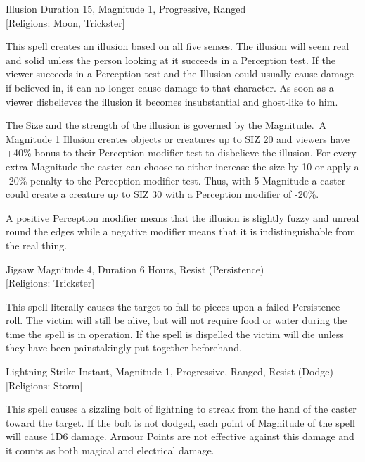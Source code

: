 \begin{rpg-spell}
{Illusion}
{Duration 15, Magnitude 1, Progressive, Ranged\\{[Religions: Moon, Trickster]}}

This spell creates an illusion based on all five senses. The illusion will seem real and solid unless the person looking at it succeeds in a Perception test. If the viewer succeeds in a Perception test and the Illusion could usually cause damage if believed in, it can no longer cause damage to that character. As soon as a viewer disbelieves the illusion it becomes insubstantial and ghost-like to him.

The Size and the strength of the illusion is governed by the Magnitude. A Magnitude 1 Illusion creates objects or creatures up to SIZ 20 and viewers have +40\% bonus to their Perception modifier test to disbelieve the illusion. For every extra Magnitude the caster can choose to either increase the size by 10 or apply a -20\% penalty to the Perception modifier test. Thus, with 5 Magnitude a caster could create a creature up to SIZ 30 with a Perception modifier of -20\%.
    
A positive Perception modifier means that the illusion is slightly fuzzy and unreal round the edges while a negative modifier means that it is indistinguishable from the real thing.
\end{rpg-spell}

\begin{rpg-spell}
{Jigsaw}
{Magnitude 4, Duration 6 Hours, Resist (Persistence)\\{[Religions: Trickster]}}

This spell literally causes the target to fall to pieces upon a failed Persistence roll. The victim will still be alive, but will not require food or water during the time the spell is in operation. If the spell is dispelled the victim will die unless they have been painstakingly put together beforehand. 
\end{rpg-spell}

\begin{rpg-spell}
{Lightning Strike}
{Instant, Magnitude 1, Progressive, Ranged, Resist (Dodge)\\{[Religions: Storm]}}

This spell causes a sizzling bolt of lightning to streak from the hand of the caster toward the target. If the bolt is not dodged, each point of Magnitude of the spell will cause 1D6 damage. Armour Points are not effective against this damage and it counts as both magical and electrical damage.
\end{rpg-spell}

